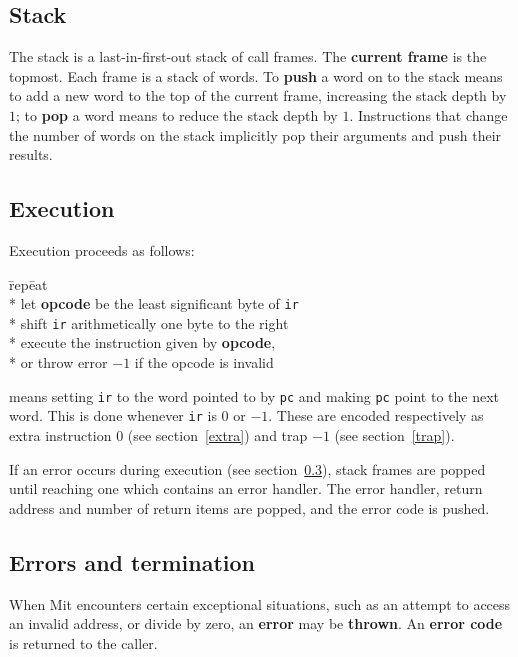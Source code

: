 \documentclass[a4paper]{article}
\begin{document}
\subsection{Stack}

The stack is a last-in-first-out stack of call frames. The {\bf current frame} is the topmost. Each frame is a stack of words. To {\bf push} a word on to the stack means to add a new word to the top of the current frame, increasing the stack depth by $1$; to {\bf pop} a word means to reduce the stack depth by $1$. Instructions that change the number of words on the stack implicitly pop their arguments and push their results.


\subsection{Execution}
\label{execution}

Execution proceeds as follows:

\begin{tabbing}
\hspace{0.2in}\=rep\=eat\+\+ \\*
let \textbf{opcode} be the least significant byte of {\tt ir} \\*
shift {\tt ir} arithmetically one byte to the right \\*
execute the instruction given by \textbf{opcode}, \\*
\hspace{1em}or throw error $-1$ if the opcode is invalid \-
\end{tabbing}

 means setting {\tt ir} to the word pointed to by {\tt pc} and making {\tt pc} point to the next word. This is done whenever {\tt ir} is $0$ or $-1$. These are encoded respectively as extra instruction $0$ (see section~\ref{extra}) and trap $-1$ (see section~\ref{trap}).

If an error occurs during execution (see section~\ref{errors}),
stack frames are popped until reaching one which contains an error handler.
The error handler, return address and number of return items are popped,
and the error code is pushed.


\subsection{Errors and termination}
\label{errors}

When Mit encounters certain exceptional situations, such as an attempt to access an invalid address, or divide by zero, an {\bf error} may be {\bf thrown}. An {\bf error code} is returned to the caller.
\end{document}
